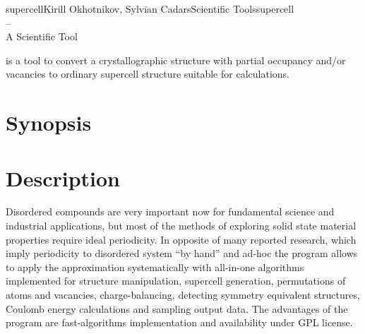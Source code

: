\documentclass[a4paper,english]{article}
\begin{document}
\newcommand{\Dd}{-{}-}

\begin{Name}{1}{supercell}{Kirill Okhotnikov, Sylvian Cadars}{Scientific Tools}{supercell\\--\\ A Scientific Tool}

   is a tool to convert a crystallographic structure with partial occupancy and/or vacancies to  ordinary supercell structure suitable for calculations.
\end{Name}

\section{Synopsis}

\begin{Description}\setlength{\itemsep}{0cm}
\item[]
 \Opt{-h, \Dd help}
\item[]
   
\item[]
  \OptArg{\Dd input=}{input-file}

\end{Description}

\section{Description}
Disordered compounds are very important now for fundamental science and industrial applications, but most of the methods of exploring solid state material properties require ideal periodicity. In opposite of many reported research, which imply periodicity to disordered system ``by hand'' and ad-hoc the program  allows to apply the approximation systematically with all-in-one algorithms implemented for structure manipulation, supercell generation, permutations of atoms and vacancies, charge-balancing, detecting symmetry equivalent structures, Coulomb energy calculations and sampling output data. The advantages of the program are fast-algorithms implementation and availability under GPL license. 
\end{document}
